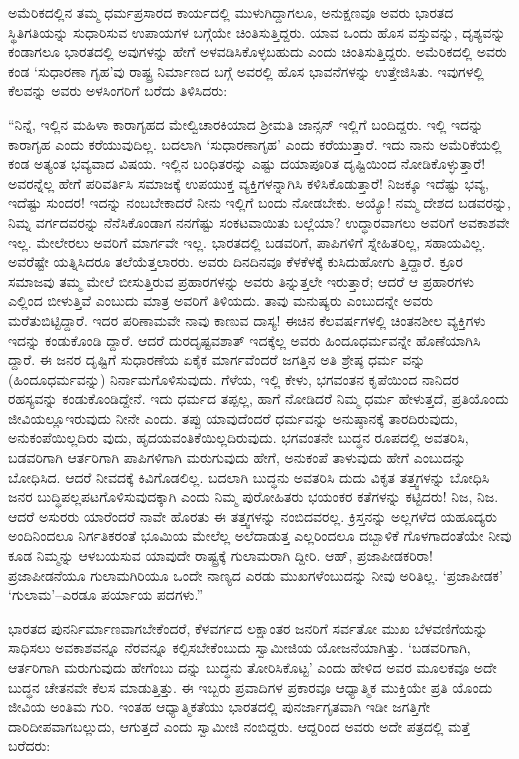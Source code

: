 ಅಮೆರಿಕದಲ್ಲಿನ ತಮ್ಮ ಧರ್ಮಪ್ರಸಾರದ ಕಾರ್ಯದಲ್ಲಿ ಮುಳುಗಿದ್ದಾಗಲೂ, ಅನುಕ್ಷಣವೂ ಅವರು ಭಾರತದ ಸ್ಥಿತಿಗತಿಯನ್ನು ಸುಧಾರಿಸುವ ಉಪಾಯಗಳ ಬಗ್ಗೆಯೇ ಚಿಂತಿಸುತ್ತಿದ್ದರು. ಯಾವ ಒಂದು ಹೊಸ ವಸ್ತುವನ್ನು, ದೃಶ್ಯವನ್ನು ಕಂಡಾಗಲೂ ಭಾರತದಲ್ಲಿ ಅವುಗಳನ್ನು ಹೇಗೆ ಅಳವಡಿಸಿಕೊಳ್ಳಬಹುದು ಎಂದು ಚಿಂತಿಸುತ್ತಿದ್ದರು. ಅಮೆರಿಕದಲ್ಲಿ ಅವರು ಕಂಡ ‘ಸುಧಾರಣಾ ಗೃಹ’ವು  ರಾಷ್ಟ್ರ ನಿರ್ಮಾಣದ ಬಗ್ಗೆ ಅವರಲ್ಲಿ ಹೊಸ ಭಾವನೆಗಳನ್ನು ಉತ್ತೇಜಿಸಿತು. ಇವುಗಳಲ್ಲಿ ಕೆಲವನ್ನು ಅವರು ಅಳಸಿಂಗರಿಗೆ ಬರೆದು ತಿಳಿಸಿದರು:

“ನಿನ್ನೆ, ಇಲ್ಲಿನ ಮಹಿಳಾ ಕಾರಾಗೃಹದ ಮೇಲ್ವಿಚಾರಕಿಯಾದ ಶ್ರೀಮತಿ ಜಾನ್ಸನ್ ಇಲ್ಲಿಗೆ ಬಂದಿದ್ದರು. ಇಲ್ಲಿ ಇದನ್ನು ಕಾರಾಗೃಹ ಎಂದು ಕರೆಯುವುದಿಲ್ಲ. ಬದಲಾಗಿ ‘ಸುಧಾರಣಾಗೃಹ’ ಎಂದು ಕರೆಯುತ್ತಾರೆ. ಇದು ನಾನು ಅಮೆರಿಕೆಯಲ್ಲಿ ಕಂಡ ಅತ್ಯಂತ ಭವ್ಯವಾದ ವಿಷಯ. ಇಲ್ಲಿನ ಬಂಧಿತರನ್ನು ಎಷ್ಟು ದಯಾಪೂರಿತ ದೃಷ್ಟಿಯಿಂದ ನೋಡಿಕೊಳ್ಳುತ್ತಾರೆ! ಅವರನ್ನೆಲ್ಲ ಹೇಗೆ ಪರಿವರ್ತಿಸಿ ಸಮಾಜಕ್ಕೆ ಉಪಯುಕ್ತ ವ್ಯಕ್ತಿಗಳನ್ನಾಗಿಸಿ ಕಳಿಸಿಕೊಡುತ್ತಾರೆ! ನಿಜಕ್ಕೂ ಇದೆಷ್ಟು ಭವ್ಯ, ಇದೆಷ್ಟು ಸುಂದರ! ಇದನ್ನು ನಂಬಬೇಕಾದರೆ ನೀನು ಇಲ್ಲಿಗೆ ಬಂದು ನೋಡಬೇಕು. ಅಯ್ಯೊ! ನಮ್ಮ ದೇಶದ ಬಡವರನ್ನು, ನಿಮ್ನ ವರ್ಗದವರನ್ನು ನೆನೆಸಿಕೊಂಡಾಗ ನನಗೆಷ್ಟು ಸಂಕಟವಾಯಿತು ಬಲ್ಲೆಯಾ? ಉದ್ಧಾರವಾಗಲು ಅವರಿಗೆ ಅವಕಾಶವೇ ಇಲ್ಲ. ಮೇಲೇರಲು ಅವರಿಗೆ ಮಾರ್ಗವೇ ಇಲ್ಲ. ಭಾರತದಲ್ಲಿ ಬಡವರಿಗೆ, ಪಾಪಿಗಳಿಗೆ ಸ್ನೇಹಿತರಿಲ್ಲ, ಸಹಾಯವಿಲ್ಲ. ಅವರೆಷ್ಟೇ ಯತ್ನಿಸಿದರೂ ತಲೆಯೆತ್ತಲಾರರು. ಅವರು ದಿನದಿನವೂ ಕೆಳಕೆಳಕ್ಕೆ ಕುಸಿದುಹೋಗು ತ್ತಿದ್ದಾರೆ. ಕ್ರೂರ ಸಮಾಜವು ತಮ್ಮ ಮೇಲೆ ಬೀಸುತ್ತಿರುವ ಪ್ರಹಾರಗಳನ್ನು ಅವರು ತಿನ್ನುತ್ತಲೇ ಇರುತ್ತಾರೆ; ಆದರೆ ಆ ಪ್ರಹಾರಗಳು ಎಲ್ಲಿಂದ ಬೀಳುತ್ತಿವೆ ಎಂಬುದು ಮಾತ್ರ ಅವರಿಗೆ ತಿಳಿಯದು. ತಾವು ಮನುಷ್ಯರು ಎಂಬುದನ್ನೇ ಅವರು ಮರೆತುಬಿಟ್ಟಿದ್ದಾರೆ. ಇದರ ಪರಿಣಾಮವೇ ನಾವು ಕಾಣುವ ದಾಸ್ಯ! ಈಚಿನ ಕೆಲವರ್ಷಗಳಲ್ಲಿ ಚಿಂತನಶೀಲ ವ್ಯಕ್ತಿಗಳು ಇದನ್ನು ಕಂಡುಕೊಂಡಿ ದ್ದಾರೆ. ಆದರೆ ದುರದೃಷ್ಟವಶಾತ್ ಇದಕ್ಕೆಲ್ಲ ಅವರು ಹಿಂದೂಧರ್ಮವನ್ನೇ ಹೊಣೆಯಾಗಿಸಿ ದ್ದಾರೆ. ಈ ಜನರ ದೃಷ್ಟಿಗೆ ಸುಧಾರಣೆಯ ಏಕೈಕ ಮಾರ್ಗವೆಂದರೆ ಜಗತ್ತಿನ ಅತಿ ಶ್ರೇಷ್ಠ ಧರ್ಮ ವನ್ನು (ಹಿಂದೂಧರ್ಮವನ್ನು) ನಿರ್ನಾಮಗೊಳಿಸುವುದು. ಗೆಳೆಯ, ಇಲ್ಲಿ ಕೇಳು, ಭಗವಂತನ ಕೃಪೆಯಿಂದ ನಾನಿದರ ರಹಸ್ಯವನ್ನು ಕಂಡುಕೊಂಡಿದ್ದೇನೆ. ಇದು ಧರ್ಮದ ತಪ್ಪಲ್ಲ, ಹಾಗೆ ನೋಡಿದರೆ ನಿಮ್ಮ ಧರ್ಮ ಹೇಳುತ್ತದೆ, ಪ್ರತಿಯೊಂದು ಜೀವಿಯಲ್ಲೂಇರುವುದು ನೀನೇ ಎಂದು. ತಪ್ಪು ಯಾವುದೆಂದರೆ ಧರ್ಮವನ್ನು ಅನುಷ್ಠಾನಕ್ಕೆ ತಾರದಿರುವುದು, ಅನುಕಂಪೆಯಿಲ್ಲದಿರು ವುದು, ಹೃದಯವಂತಿಕೆಯಿಲ್ಲದಿರುವುದು. ಭಗವಂತನೇ ಬುದ್ಧನ ರೂಪದಲ್ಲಿ ಅವತರಿಸಿ, ಬಡವರಿಗಾಗಿ ಆರ್ತರಿಗಾಗಿ ಪಾಪಿಗಳಿಗಾಗಿ ಮರುಗುವುದು ಹೇಗೆ, ಅನುಕಂಪೆ ತಾಳುವುದು ಹೇಗೆ ಎಂಬುದನ್ನು ಬೋಧಿಸಿದ. ಆದರೆ ನೀವದಕ್ಕೆ ಕಿವಿಗೊಡಲಿಲ್ಲ. ಬದಲಾಗಿ ಬುದ್ಧನು ಅವತರಿಸಿ ದುದು ವಿಕೃತ ತತ್ತ್ವಗಳನ್ನು ಬೋಧಿಸಿ ಜನರ ಬುದ್ಧಿಪಲ್ಲಪಟಗೊಳಿಸುವುದಕ್ಕಾಗಿ ಎಂದು ನಿಮ್ಮ ಪುರೋಹಿತರು ಭಯಂಕರ ಕತೆಗಳನ್ನು ಕಟ್ಟಿದರು! ನಿಜ, ನಿಜ. ಆದರೆ ಅಸುರರು ಯಾರೆಂದರೆ ನಾವೇ ಹೊರತು ಈ ತತ್ತ್ವಗಳನ್ನು ನಂಬಿದವರಲ್ಲ. ಕ್ರಿಸ್ತನನ್ನು ಅಲ್ಲಗಳೆದ ಯಹೂದ್ಯರು ಅಂದಿನಿಂದಲೂ ನಿರ್ಗತಿಕರಂತೆ ಭೂಮಿಯ ಮೇಲೆಲ್ಲ ಅಲೆದಾಡುತ್ತ ಎಲ್ಲರಿಂದಲೂ ದಬ್ಬಾಳಿಕೆ ಗೊಳಗಾದಂತೆಯೇ ನೀವು ಕೂಡ ನಿಮ್ಮನ್ನು ಆಳಬಯಸುವ ಯಾವುದೇ ರಾಷ್ಟ್ರಕ್ಕೆ ಗುಲಾಮರಾಗಿ ದ್ದೀರಿ. ಆಹ್, ಪ್ರಜಾಪೀಡಕರಿರಾ! ಪ್ರಜಾಪೀಡನೆಯೂ ಗುಲಾಮಗಿರಿಯೂ ಒಂದೇ ನಾಣ್ಯದ ಎರಡು ಮುಖಗಳೆಂಬುದನ್ನು ನೀವು ಅರಿತಿಲ್ಲ. ‘ಪ್ರಜಾಪೀಡಕ’ ‘ಗುಲಾಮ’–ಎರಡೂ ಪರ್ಯಾಯ ಪದಗಳು.”

ಭಾರತದ ಪುನರ್ನಿರ್ಮಾಣವಾಗಬೇಕೆಂದರೆ, ಕೆಳವರ್ಗದ ಲಕ್ಷಾಂತರ ಜನರಿಗೆ ಸರ್ವತೋ ಮುಖ ಬೆಳವಣಿಗೆಯನ್ನು ಸಾಧಿಸಲು ಅವಕಾಶವನ್ನೂ ನೆರವನ್ನೂ ಕಲ್ಪಿಸಬೇಕೆಂಬುದು ಸ್ವಾಮೀಜಿಯ ಯೋಜನೆಯಾಗಿತ್ತು. ‘ಬಡವರಿಗಾಗಿ, ಆರ್ತರಿಗಾಗಿ ಮರುಗುವುದು ಹೇಗೆಂಬು ದನ್ನು ಬುದ್ಧನು ತೋರಿಸಿಕೊಟ್ಟ’ ಎಂದು ಹೇಳಿದ ಅವರ ಮೂಲಕವೂ ಅದೇ ಬುದ್ಧನ ಚೇತನವೇ ಕೆಲಸ ಮಾಡುತ್ತಿತ್ತು. ಈ ಇಬ್ಬರು ಪ್ರವಾದಿಗಳ ಪ್ರಕಾರವೂ ಆಧ್ಯಾತ್ಮಿಕ ಮುಕ್ತಿಯೇ ಪ್ರತಿ ಯೊಂದು ಜೀವಿಯ ಅಂತಿಮ ಗುರಿ. ಇಂತಹ ಆಧ್ಯಾತ್ಮಿಕತೆಯು ಭಾರತದಲ್ಲಿ ಪುನರ್ಜಾಗೃತವಾಗಿ ಇಡೀ ಜಗತ್ತಿಗೇ ದಾರಿದೀಪವಾಗಬಲ್ಲುದು, ಆಗುತ್ತದೆ ಎಂದು ಸ್ವಾಮೀಜಿ ನಂಬಿದ್ದರು. ಆದ್ದರಿಂದ ಅವರು ಅದೇ ಪತ್ರದಲ್ಲಿ ಮತ್ತೆ ಬರೆದರು:

